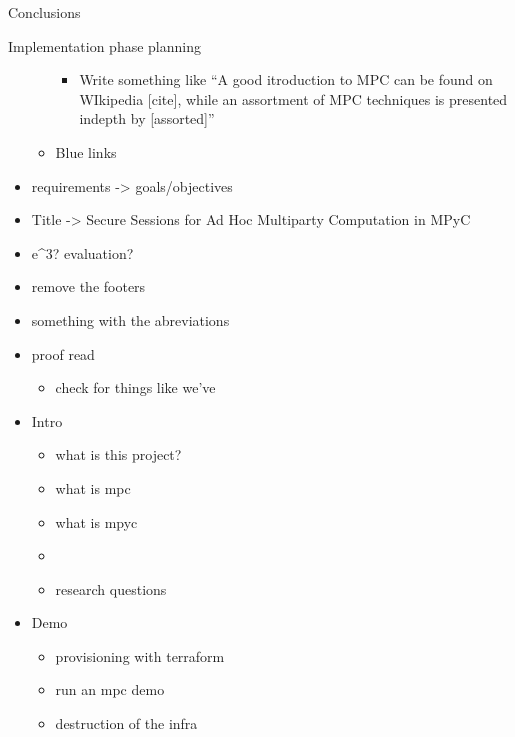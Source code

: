 \begin{frame}[fragile]{Conclusions}
\begin{block}{Implementation phase planning}
\begin{itemize}
\begin{itemize}
    \begin{itemize}
    \tightlist
    \item
      Write something like ``A good itroduction to MPC can be found on
      WIkipedia {[}cite{]}, while an assortment of MPC techniques is
      presented indepth by {[}assorted{]}''
    \end{itemize}
  \item
    Blue links
  \end{itemize}
\item
  requirements -\textgreater{} goals/objectives
\item
  Title -\textgreater{} Secure Sessions for Ad Hoc Multiparty
  Computation in MPyC
\item
  e\^{}3? evaluation?
\item
  remove the footers
\item
  something with the abreviations
\item
  proof read

  \begin{itemize}
  \tightlist
  \item
    check for things like we've
  \end{itemize}
\item
  Intro

  \begin{itemize}
  \tightlist
  \item
    what is this project?
  \item
    what is mpc
  \item
    what is mpyc
  \item
  \item
    research questions
  \end{itemize}
\item
  Demo

  \begin{itemize}
  \tightlist
  \item
    provisioning with terraform
  \item
    run an mpc demo
  \item
    destruction of the infra
  \end{itemize}
\end{itemize}
\end{block}
\end{frame}
